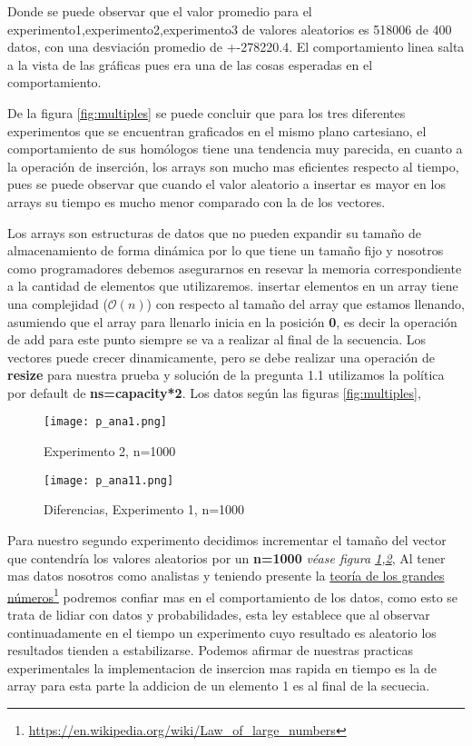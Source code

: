 \documentclass[paper=a4, fontsize=12pt]{article} 		%
\newcommand\fnurl[2]{%
\href{#2}{#1}\footnote{\url{#2}}%
}
\numberwithin{equation}{section}						%
\numberwithin{table}{section} 							%
\begin{document}
Donde se puede observar que el valor promedio para el experimento1,experimento2,experimento3  de valores aleatorios es 518006 de 400 datos, con una desviación promedio de +-278220.4. El comportamiento linea salta a la vista de las gráficas pues era una de las cosas esperadas en el comportamiento. 

De la figura \ref{fig:multiples} se puede concluir que para los tres diferentes experimentos que se encuentran graficados en el mismo plano cartesiano, el comportamiento de sus homólogos tiene una tendencia muy parecida, en cuanto a la operación de inserción, los arrays son mucho mas eficientes respecto al tiempo, pues se puede observar que cuando el valor aleatorio a insertar es mayor en los arrays su tiempo es mucho menor comparado con la de los vectores.

Los arrays son estructuras de datos que no pueden expandir su tamaño de almacenamiento de forma dinámica por lo que tiene un tamaño fijo y nosotros como programadores debemos asegurarnos en resevar la memoria correspondiente a la cantidad de elementos que utilizaremos. insertar elementos en un array tiene una complejidad ($\mathcal{O}(n)$) con respecto al tamaño del array que estamos llenando, asumiendo que el array para llenarlo inicia en la posición \textbf{0}, es decir la operación de add para este punto siempre se va a realizar al final de la secuencia. Los vectores puede crecer dinamicamente, pero se debe realizar una operación de \textbf{resize} para nuestra prueba y solución de la pregunta 1.1 utilizamos la política por default de \textbf{ns=capacity*2}. Los datos según las figuras \ref{fig:multiples},\
\begin{figure}[H]
\texttt{[image: p\_ana1.png]}
\caption{Experimento 2, n=1000}
\label{fig:ana1}
\end{figure}

\begin{figure}[H]
\texttt{[image: p\_ana11.png]}
\caption{Diferencias, Experimento 1, n=1000}
\label{fig:ana2}
\end{figure}
Para nuestro segundo experimento decidimos incrementar el tamaño del vector que contendría los valores aleatorios por un \textbf{n=1000} \emph{véase figura \ref{fig:ana1},\ref{fig:ana2}}, Al tener mas datos nosotros como analistas y teniendo presente la \fnurl{teoría de los grandes números}{https://en.wikipedia.org/wiki/Law_of_large_numbers} podremos confiar mas en el comportamiento de los datos, como esto se trata de lidiar con datos y  probabilidades, esta ley establece que al observar continuadamente en el tiempo un experimento cuyo resultado es aleatorio los resultados tienden a estabilizarse. 
Podemos afirmar de nuestras practicas experimentales la implementacion de insercion mas rapida en tiempo es la de array para esta parte la addicion de un elemento 1 es al final de la secuecia. 
\end{document}
